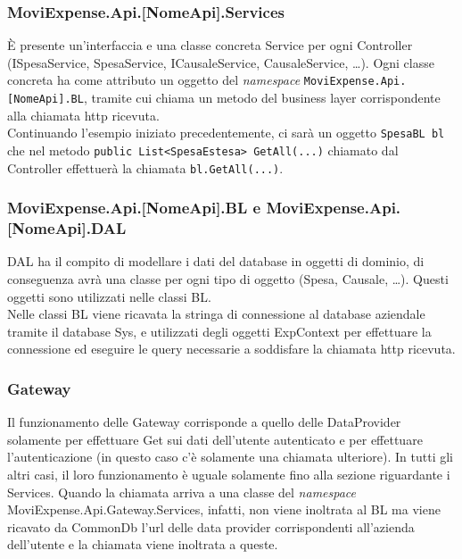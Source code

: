 \subsubsection{MoviExpense.Api.[NomeApi].Services}
\label{cap:services}

È presente un'interfaccia e una classe concreta Service per ogni Controller (ISpesaService, SpesaService, ICausaleService, CausaleService, \dots). Ogni classe concreta ha come attributo un oggetto del \emph{namespace} \verb+MoviExpense.Api.[NomeApi].BL+, tramite cui chiama un metodo del business layer corrispondente alla chiamata http ricevuta.\\
Continuando l'esempio iniziato precedentemente, ci sarà un oggetto \verb+SpesaBL bl+ che nel metodo \verb+public List<SpesaEstesa> GetAll(...)+ chiamato dal Controller effettuerà la chiamata \verb+bl.GetAll(...)+.

\subsubsection{MoviExpense.Api.[NomeApi].BL e MoviExpense.Api.[NomeApi].DAL}

DAL ha il compito di modellare i dati del database in oggetti di dominio, di conseguenza avrà una classe per ogni tipo di oggetto (Spesa, Causale, \dots). Questi oggetti sono utilizzati nelle classi BL.\\
Nelle classi BL viene ricavata la stringa di connessione al database aziendale tramite il database Sys, e utilizzati degli oggetti ExpContext per effettuare la connessione ed eseguire le query necessarie a soddisfare la chiamata http ricevuta.

\subsubsection{Gateway}

Il funzionamento delle  Gateway corrisponde a quello delle DataProvider solamente per effettuare Get sui dati dell'utente autenticato e per effettuare l'autenticazione (in questo caso c'è solamente una chiamata ulteriore). In tutti gli altri casi, il loro funzionamento è uguale solamente fino alla sezione riguardante i Services. Quando la chiamata arriva a una classe del \emph{namespace} MoviExpense.Api.Gateway.Services, infatti, non viene inoltrata al BL ma viene ricavato da CommonDb l'url delle  data provider corrispondenti all'azienda dell'utente e la chiamata viene inoltrata a queste.


